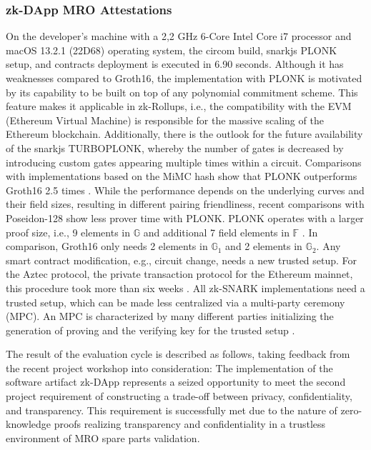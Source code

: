 \subsubsection{zk-DApp MRO Attestations}
On the developer's machine with a 2,2 GHz 6-Core Intel Core i7 processor and macOS 13.2.1 (22D68) operating system, the circom build, snarkjs PLONK setup, and contracts deployment is executed in 6.90 seconds. Although it has weaknesses compared to Groth16, the implementation with PLONK is motivated by its capability to be built on top of any polynomial commitment scheme. This feature makes it applicable in zk-Rollups, i.e., the compatibility with the EVM (Ethereum Virtual Machine) is responsible for the massive scaling of the Ethereum blockchain. Additionally, there is the outlook for the future availability of the snarkjs TURBOPLONK, whereby the number of gates is decreased by introducing custom gates appearing multiple times within a circuit. Comparisons with implementations based on the MiMC hash show that PLONK outperforms Groth16 2.5 times \citep{turboplonk}. While the performance depends on the underlying curves and their field sizes, resulting in different pairing friendliness, recent comparisons with Poseidon-128 show less prover time with PLONK. PLONK operates with a larger proof size, i.e., 9 elements in \begin{math} \mathbb{G}\end{math} and additional 7 field elements in \begin{math} \mathbb{F}\end{math} \citep{PLONKcryptoeprint:2019/953}. In comparison, Groth16 only needs 2 elements in \begin{math} \mathbb{G}_1\end{math} and 2 elements in \begin{math} \mathbb{G}_2\end{math}. Any smart contract modification, e.g., circuit change, needs a new trusted setup. For the Aztec protocol, the private transaction protocol for the Ethereum mainnet, this procedure took more than six weeks \citep{turboplonk}. All zk-SNARK implementations need a trusted setup, which can be made less centralized via a multi-party ceremony (MPC). An MPC is characterized by many different parties initializing the generation of proving and the verifying key for the trusted setup \citep{Thaler}. 

The result of the evaluation cycle is described as follows, taking feedback from the recent project workshop into consideration: The implementation of the software artifact zk-DApp represents a seized opportunity to meet the second project requirement of constructing a trade-off between privacy, confidentiality, and transparency. This requirement is successfully met due to the nature of zero-knowledge proofs realizing transparency and confidentiality in a trustless environment of MRO spare parts validation. 


